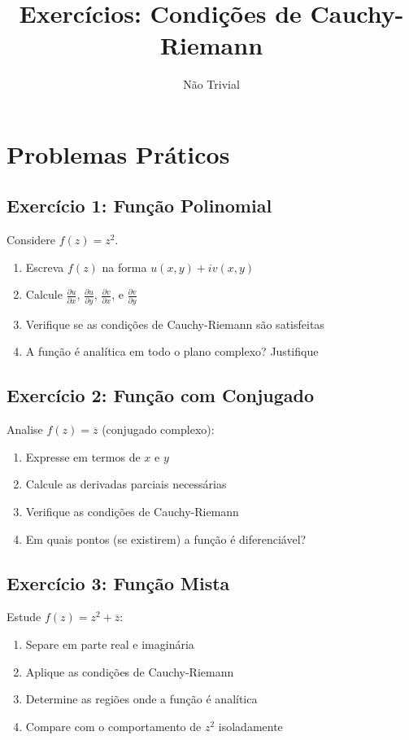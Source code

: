 \documentclass{article}
\title{Exercícios: Condições de Cauchy-Riemann}
\author{Não Trivial}
\date{}
\begin{document}
\maketitle

\section*{Problemas Práticos}

\subsection*{Exercício 1: Função Polinomial}
Considere \( f(z) = z^2 \).
\begin{enumerate}
    \item Escreva \( f(z) \) na forma \( u(x,y) + iv(x,y) \)
    \item Calcule \( \frac{\partial u}{\partial x} \), \( \frac{\partial u}{\partial y} \), \( \frac{\partial v}{\partial x} \), e \( \frac{\partial v}{\partial y} \)
    \item Verifique se as condições de Cauchy-Riemann são satisfeitas
    \item A função é analítica em todo o plano complexo? Justifique
\end{enumerate}

\subsection*{Exercício 2: Função com Conjugado}
Analise \( f(z) = \overline{z} \) (conjugado complexo):
\begin{enumerate}
    \item Expresse em termos de \( x \) e \( y \)
    \item Calcule as derivadas parciais necessárias
    \item Verifique as condições de Cauchy-Riemann
    \item Em quais pontos (se existirem) a função é diferenciável?
\end{enumerate}

\subsection*{Exercício 3: Função Mista}
Estude \( f(z) = z^2 + \overline{z} \):
\begin{enumerate}
    \item Separe em parte real e imaginária
    \item Aplique as condições de Cauchy-Riemann
    \item Determine as regiões onde a função é analítica
    \item Compare com o comportamento de \( z^2 \) isoladamente
\end{enumerate}
\end{document}
